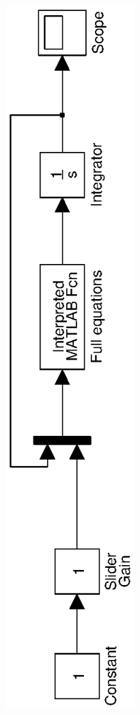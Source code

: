 \begin{figure}[htp]
\centering
\includegraphics[angle=-90,trim= 0mm 7mm 5mm 10mm]{img/ex1/model1.eps}
\caption{}
\label{fig:ex1simmodel}
\end{figure}
